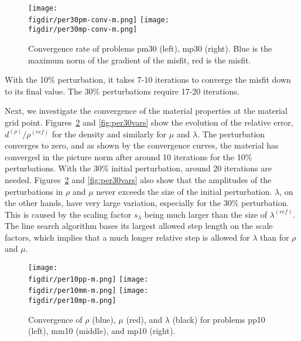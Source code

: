 \documentclass[12pt]{report}
\def\figdir{mfigs}
\begin{document}
\begin{figure}
\begin{center}
\texttt{[image: \\figdir/per30pm-conv-m.png]}\hfil
\texttt{[image: \\figdir/per30mp-conv-m.png]}
\caption{Convergence rate of problems pm30 (left), mp30 (right). Blue
is the maximum norm of the gradient of the misfit, red is the misfit.}
\label{fig:per30conv}
\end{center}
\end{figure}
With the 10\% perturbation, it takes 7-10 iterations to converge the misfit down 
to its final value. The 30\% perturbations require 17-20 iterations. 
\par
Next, we investigate the convergence of the material properties at the material grid point.
Figures~\ref{fig:per10vars} and \ref{fig:per30vars} show the evolution of the 
relative error, $d^{(\rho)}/\rho^{(ref)}$ for the density and similarly for $\mu$ and $\lambda$.
The perturbation converges to zero, and as shown by the convergence curves, the material has
converged in the picture norm after around 10 iterations for the 10\%  perturbations. With the
30\% initial perturbation, around 20 iterations are needed. Figures~\ref{fig:per10vars} and \ref{fig:per30vars}
also show that the amplitudes of the perturbations in $\rho$ and $\mu$ never exceeds the size of the
initial perturbation. $\lambda$, on the other hands, have very large variation, especially for the 30\%
perturbation. This is caused by the scaling factor $s_\lambda$ being much larger than the 
size of $\lambda^{(ref)}$. The line search algorithm bases its largest allowed step length on the scale
factors, which implies that a much longer relative step is allowed for $\lambda$ than for $\rho$ and $\mu$.

\begin{figure}
\begin{center}
\texttt{[image: \\figdir/per10pp-m.png]}\hfil
\texttt{[image: \\figdir/per10mm-m.png]}\hfil
\texttt{[image: \\figdir/per10mp-m.png]}
\caption{Convergence of $\rho$ (blue), $\mu$ (red), and $\lambda$ (black) for 
problems pp10 (left), mm10 (middle), and mp10 (right).}
\label{fig:per10vars}
\end{center}
\end{figure}
\end{document}
